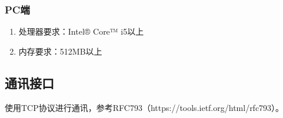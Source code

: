\subsubsection{PC端}
	\begin{enumerate}
		\item 处理器要求：Intel® Core™ i5以上
		\item 内存要求：512MB以上
	\end{enumerate}
\subsection{通讯接口}
使用TCP协议进行通讯，参考RFC793（https://tools.ietf.org/html/rfc793）。
